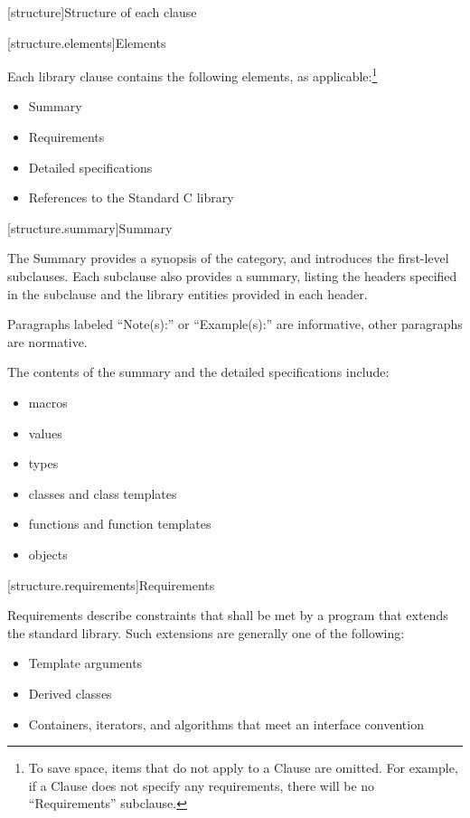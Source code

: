 [structure]{Structure of each clause}

[structure.elements]{Elements}

\pnum
Each library clause contains the following elements, as applicable:\footnote{To
save space, items that do not apply to a Clause are omitted.
For example, if a Clause does not specify any requirements,
there will be no ``Requirements'' subclause.}

\begin{itemize}
\item Summary
\item Requirements
\item Detailed specifications
\item References to the Standard C library
\end{itemize}

[structure.summary]{Summary}

\pnum
The Summary provides a synopsis of the category, and introduces the first-level subclauses.
Each subclause also provides a summary, listing the headers specified in the
subclause and the library entities provided in each header.

\pnum
Paragraphs labeled ``Note(s):'' or ``Example(s):'' are informative, other paragraphs
are normative.

\pnum
The contents of the summary and the detailed specifications include:

\begin{itemize}
\item macros
\item values
\item types
\item classes and class templates
\item functions and function templates
\item objects
\end{itemize}

[structure.requirements]{Requirements}

\pnum
{}%
Requirements describe constraints that shall be met by a \Cpp program that extends the standard library.
Such extensions are generally one of the following:

\begin{itemize}
\item Template arguments
\item Derived classes
\item Containers, iterators, and algorithms that meet an interface convention
\end{itemize}

